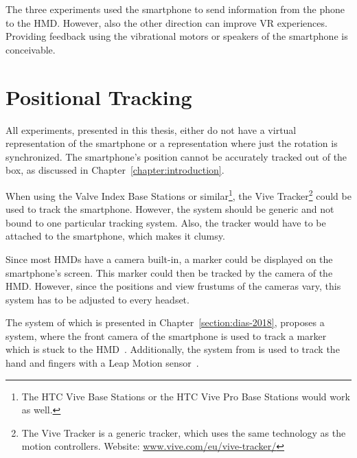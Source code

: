 The three experiments used the smartphone to send information from the phone to the \ac{HMD}. However, also the other direction can improve \ac{VR} experiences. Providing feedback using the vibrational motors or speakers of the smartphone is conceivable.


\section{Positional Tracking}\label{section:fw-positional-tracking}

All experiments, presented in this thesis, either do not have a virtual representation of the smartphone or a representation where just the rotation is synchronized. The smartphone's position cannot be accurately tracked out of the box, as discussed in Chapter~\ref{chapter:introduction}.

When using the Valve Index Base Stations or similar\footnote{The HTC Vive Base Stations or the HTC Vive Pro Base Stations would work as well.}, the Vive Tracker\footnote{The Vive Tracker is a generic tracker, which uses the same technology as the motion controllers. Website: \href{https://www.vive.com/eu/vive-tracker/}{www.vive.com/eu/vive-tracker/}} could be used to track the smartphone. However, the system should be generic and not bound to one particular tracking system. Also, the tracker would have to be attached to the smartphone, which makes it clumsy.

Since most \acp{HMD} have a camera built-in, a marker could be displayed on the smartphone's screen. This marker could then be tracked by the camera of the \ac{HMD}. However, since the positions and view frustums of the cameras vary, this system has to be adjusted to every headset.

The system of \citeauthor{Dias.2018} which is presented in Chapter~\ref{section:dias-2018}, proposes a system, where the front camera of the smartphone is used to track a marker which is stuck to the \ac{HMD}~\cite[4]{Dias.2018}. Additionally, the system from \citeauthor{Afonso.2017} is used to track the hand and fingers with a Leap Motion sensor~\cite[247]{Afonso.2017}.

